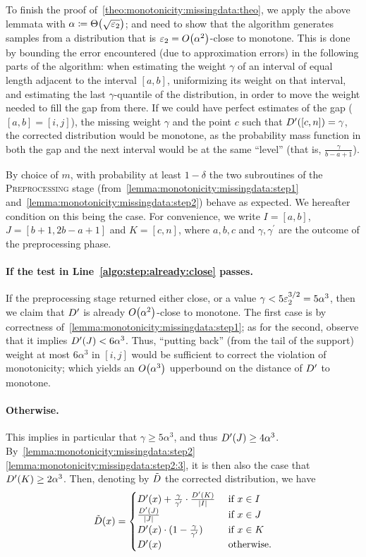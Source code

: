 \noindent To finish the proof of~\autoref{theo:monotonicity:missingdata:theo}, we apply the above lemmata with  $\alpha\eqdef\bigTheta{\sqrt{\eps_2}}$; and need to show that the algorithm generates samples from a distribution that is $\eps_2=\bigO{\alpha^2}$-close to monotone. This is done by bounding the error encountered (due to approximation errors) in the following parts of the algorithm:  when estimating the weight $\gamma$ of an interval of equal length adjacent to the interval $[a,b]$, uniformizing its weight on that interval, and estimating the last $\gamma$-quantile of the distribution, in order to move the weight needed to fill the gap from there. 
If we could have perfect estimates of the gap ($[a,b]=[i,j]$), the missing weight $\gamma$ and the point $c$ such that $D^\prime([c,n])=\gamma$, the corrected distribution would be monotone, as the probability mass function in both the gap and the next interval would be at the same ``level'' (that is, $\frac{\gamma}{b-a+1}$).

By choice of $m$, with probability at least $1-\delta$ the two subroutines of the \textsc{Preprocessing} stage (from~\autoref{lemma:monotonicity:missingdata:step1} and~\autoref{lemma:monotonicity:missingdata:step2}) behave as expected. We hereafter condition on this being the case. For convenience, we write $I=[a,b]$, $J=[b+1,2b-a+1]$ and $K=[c,n]$, where $a,b,c$ and $\gamma, \gamma^\prime$ are the outcome of the preprocessing phase.

\paragraph{If the test in Line~\ref{algo:step:already:close} passes.}
If the preprocessing stage returned either \textsf{close}, or a value $\gamma < 5\varepsilon_2^{3/2}=5\alpha^3$, then we claim that $D^\prime$ is already $\bigO{\alpha^2}$-close to monotone. The first case is by correctness of~\autoref{lemma:monotonicity:missingdata:step1}; as for the second, observe that it implies $D^\prime(J) < 6\alpha^3$. Thus, ``putting back'' (from the tail of the support) weight at most $6\alpha^3$ in $[i,j]$ would be sufficient to correct the violation of monotonicity; which yields an $\bigO{\alpha^3}$ upperbound on the distance of $D^\prime$ to monotone.

\paragraph{Otherwise.} This implies in particular that $\gamma \geq 5\alpha^3$, and thus $D^\prime(J) \geq 4\alpha^3$. By~\autoref{lemma:monotonicity:missingdata:step2} \ref{lemma:monotonicity:missingdata:step2:3}, it is then also the case that $D^\prime(K) \geq 2\alpha^3$. Then, denoting by $\tilde{D}$ the corrected distribution, we have
\[
\tilde{D}(x) = \begin{cases}
 D^\prime(x) + \frac{\gamma}{\gamma^\prime}\cdot\frac{D^\prime(K)}{\left\lvert I \right\rvert} & \text{ if } x\in I \\
 \frac{D^\prime(J)}{\left\lvert J \right\rvert} & \text{ if } x\in J \\
 D^\prime(x)\cdot(1-\frac{\gamma}{\gamma^\prime}) & \text{ if } x\in K \\
 D^\prime(x) & \text{ otherwise.}
\end{cases}
\]
